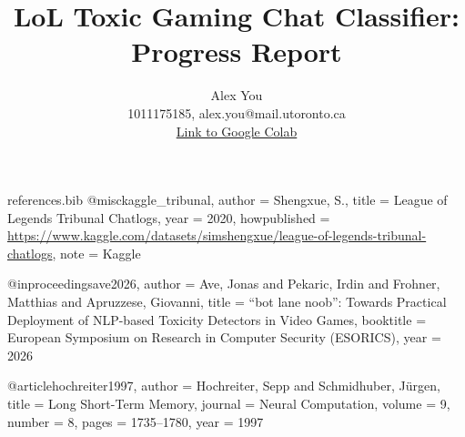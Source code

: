 \begin{filecontents*}{references.bib}
@misc{kaggle_tribunal,
  author = {Shengxue, S.},
  title = {League of Legends Tribunal Chatlogs},
  year = {2020},
  howpublished = {\url{https://www.kaggle.com/datasets/simshengxue/league-of-legends-tribunal-chatlogs}},
  note = {Kaggle}
}

@inproceedings{ave2026,
  author = {Ave, Jonas and Pekaric, Irdin and Frohner, Matthias and Apruzzese, Giovanni},
  title = {{``bot lane noob'': Towards Practical Deployment of NLP-based Toxicity Detectors in Video Games}},
  booktitle = {European Symposium on Research in Computer Security (ESORICS)},
  year = {2026}
}

@article{hochreiter1997,
  author = {Hochreiter, Sepp and Schmidhuber, J\"{u}rgen},
  title = {Long Short-Term Memory},
  journal = {Neural Computation},
  volume = {9},
  number = {8},
  pages = {1735--1780},
  year = {1997}
}
\end{filecontents*}

\documentclass[final]{article}

\usepackage[main]{aps360}
\usepackage[utf8]{inputenc} %
\usepackage[T1]{fontenc}    %
\usepackage{hyperref}       %
\usepackage{url}            %
\usepackage{booktabs}       %
\usepackage{amsfonts}       %
\usepackage{nicefrac}       %
\usepackage{microtype}      %
\usepackage{xcolor}         %
\usepackage{graphicx}       %
\usepackage{caption}        %
\captionsetup{
  justification=centering,
  singlelinecheck=false,
  skip=6pt,
  position=bottom
}
\setlength{\abovecaptionskip}{6pt}
\setlength{\belowcaptionskip}{6pt}
\setlength{\intextsep}{8pt plus 2pt minus 2pt}
\setlength{\textfloatsep}{8pt plus 2pt minus 2pt}
\setlength{\floatsep}{8pt plus 2pt minus 2pt}


\title{LoL Toxic Gaming Chat Classifier: Progress Report}

\author{%
  Alex You \\
  1011175185, alex.you@mail.utoronto.ca\\
  \href{https://drive.google.com/file/d/1ZpCdToVI99i70RV82QCT0uEILGDSMMd4/view?usp=sharing}{Link to Google Colab}\\
}



